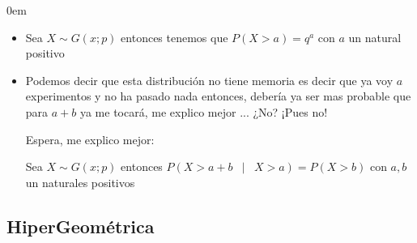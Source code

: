 \documentclass[12pt, fleqn]{report}                             %
\newenvironment{SmallIndentation}[1][0.75em]                    %
        {\begin{adjustwidth}{#1}{}\begin{footnotesize}}             %
        {\end{footnotesize}\end{adjustwidth}}                       %
\DeclareMathOperator \Space {\quad}                             %
\DeclareMathOperator \MiniSpace {\;}                            %
\newcommand \Such {\MiniSpace | \MiniSpace}                     %
\theoremstyle{break}                                            %
\begin{document}
\begin{multicols}{2}
\begin{SmallIndentation}[0em]
\begin{itemize}
                            \item 
                                Sea $X \sim G(x; p)$ entonces tenemos que $P(X > a) = q^a$ con $a$ un natural positivo

                            \item 
                                Podemos decir que esta distribución no tiene memoria es decir que ya voy $a$ experimentos
                                y no ha pasado nada entonces, debería ya ser mas probable que para $a + b$ ya me tocará,
                                me explico mejor ... ¿No? ¡Pues no!

                                Espera, me explico mejor:

                                Sea $X \sim G(x; p)$ entonces $P(X > a + b \Such X > a) = P(X > b)$ 
                                con $a, b$ un naturales positivos

                        \end{itemize}


                \end{SmallIndentation}
                \end{multicols}


            \clearpage
            \subsection{HiperGeométrica}
\end{document}
